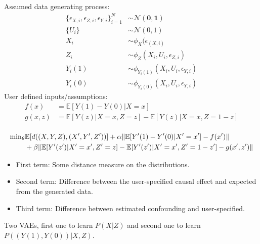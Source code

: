 \documentclass{beamer}
\DeclarePairedDelimiter\norm{\lVert}{\rVert}%
\begin{document}
\begin{frame}
	Assumed data generating process:
	\begin{equation}
		\begin{split}
			\{ \epsilon_{X, i}, \epsilon_{Z, i}, \epsilon_{Y, i} \}_{i=1}^N & \sim \mathcal{N}(\mathbf{0}, \mathbf{1}) \\
			\{ U_i \} & \sim \mathcal{N}(0, 1) \\
			X_i & \sim \phi_X(\epsilon_(X, i) \\
			Z_i & \sim \phi_Z(X_i, U_i, \epsilon_{Z, i}) \\
			Y_i(1) & \sim \phi_{Y_i(1)} (X_i, U_i, \epsilon_{Y, i}) \\
			Y_i(0) & \sim \phi_{Y_i(0)} (X_i, U_i, \epsilon_{Y, i})
		\end{split}
	\end{equation}
	User defined inputs/assumptions:
	\begin{equation}
		\begin{split}
			f(x) &= \mathbb{E}[Y(1) - Y(0) | X=x] \\
			g(x, z) &= \mathbb{E}[Y(z) | X=x, Z=z] - \mathbb{E}[Y(z) | X=x, Z=1-z] \\
		\end{split}
	\end{equation}
\end{frame}
\begin{frame}
	\begin{equation}
		\begin{split}
			\mathbf{\min}_{\theta} & \mathbb{E}[d((X, Y, Z), (X', Y', Z'))] + \alpha \norm{\mathbb{E}[Y'(1) - Y'(0) | X' = x'] -f(x') } \\
						& + \beta \norm{\mathbb{E}[Y'(z') | X'=x', Z'=z] - \mathbb{E}[Y'(z') | X'=x', Z'=1-z'] -g(x', z')}
		\end{split}
	\end{equation}

	\begin{itemize}
		\item First term: Some distance measure on the distributions.
		\item Second term: Difference between the user-specified causal effect and expected from the generated data.
		\item Third term: Difference between estimated confounding and user-specified.
	\end{itemize}
	Two VAEs, first one to learn $ P(X | Z) $ and second one to learn $ P((Y(1), Y(0)) | X, Z) $.
\end{frame}
\end{document}
